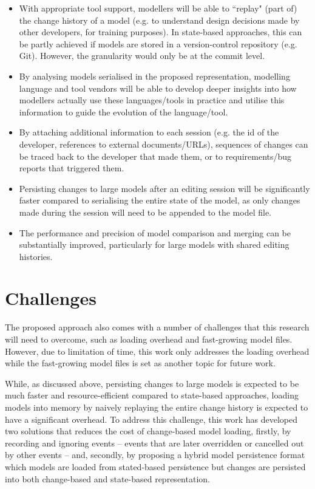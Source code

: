 \begin{itemize}
    \item With appropriate tool support, modellers will be able to ``replay" (part of) the change history of a model (e.g. to understand design decisions made by other developers, for training purposes). In state-based approaches, this can be partly achieved if models are stored in a version-control repository (e.g. Git). However, the granularity would only be at the commit level.
    \item By analysing models serialised in the proposed representation, modelling language and tool vendors will be able to develop deeper insights into how modellers actually use these languages/tools in practice and utilise this information to guide the evolution of the language/tool.
    \item By attaching additional information to each session (e.g. the id of the developer, references to external documents/URLs), sequences of changes can be traced back to the developer that made them, or to requirements/bug reports that triggered them.
    \item Persisting changes to large models after an editing session will be significantly faster compared to serialising the entire state of the model, as only changes made during the session will need to be appended to the model file.
    \item The performance and precision of model comparison and merging can be substantially improved, particularly for large models with shared editing histories.
\end{itemize}

\section{Challenges}
\label{sec:challenges}
The proposed approach also comes with a number of challenges that this research will need to overcome, such as loading overhead and fast-growing model files. However, due to limitation of time, this work only addresses the loading overhead while the fast-growing model files is set as another topic for future work.  

While, as discussed above, persisting changes to large models is expected to be much faster and resource-efficient compared to state-based approaches, loading models into memory by naively replaying the entire change history is expected to have a significant overhead. To address this challenge, this work has developed two solutions that reduces the cost of change-based model loading, firstly, by recording and ignoring events -- events that are later overridden or cancelled out by other events -- and, secondly, by proposing a hybrid model persistence format which models are loaded from stated-based persistence but changes are persisted into both change-based and state-based representation. 

